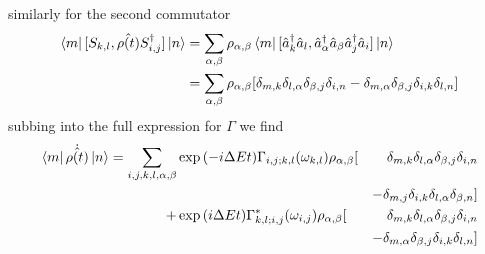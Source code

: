 similarly for the second commutator
\begin{align}
    \bra{m}[S_{k, l},
    \hat{\rho(t)}S^\dagger_{i, j}] \ket{n} & =
    \sum_{\alpha, \beta} \rho_{\alpha, \beta}\bra{m}
    [\hat{a}^\dagger_k \hat{a}_l
        ,\hat{a}^\dagger_\alpha \hat{a}_\beta
        \hat{a}^\dagger_j \hat{a}_i]
    \ket{n}                                    \\
                                           & =
    \sum_{\alpha, \beta} \rho_{\alpha, \beta} [
        \delta_{m, k}\delta_{l, \alpha}
        \delta_{\beta, j}\delta_{i, n}
        -\delta_{m, \alpha}\delta_{\beta, j}
        \delta_{i, k}\delta_{l, n}]
\end{align}
subbing into the full expression for
\(\Gamma \) we find
\begin{align}
    \bra{m}\dot{\hat{\rho{}(t)}} \ket{n} = \begin{aligned}[t]
        \sum_{i,j,k, l, \alpha, \beta} &
        \exp{(-i\Delta{}Et)}
        \Gamma_{i,j;k, l}(\omega_{k,l})
        \rho_{\alpha, \beta} [         &
            \delta_{m, k}\delta_{l, \alpha}
        \delta_{\beta, j}\delta_{i, n}                          \\
                                       &                      &
            -\delta_{m, j}\delta_{i, k}
        \delta_{l, \alpha}\delta_{\beta, n}]                    \\
        +                              & \exp{(i\Delta{}E t)}
        \Gamma^*_{k, l; i,j}(\omega_{i,j})
        \rho_{\alpha, \beta} [         &
            \delta_{m, k}\delta_{l, \alpha}
        \delta_{\beta, j}\delta_{i, n}                          \\
                                       &                      &
            - \delta_{m, \alpha}\delta_{\beta, j}
            \delta_{i, k}\delta_{l, n}]
    \end{aligned}
\end{align}

